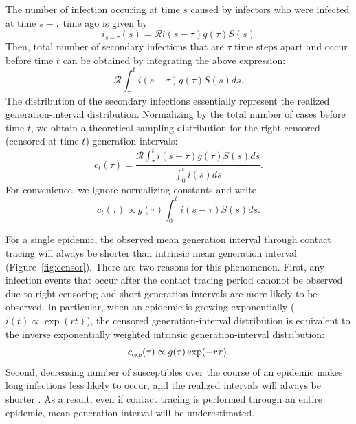 \documentclass[12pt]{article}
\newcommand{\RR}{\ensuremath{{\mathcal R}}}
\newcommand{\tsub}[2]{#1_{{\textrm{\tiny #2}}}}
\begin{document}
The number of infection occuring at time $s$ caused by infectors who were infected at time $s-\tau$ time ago is given by
\begin{equation}
i_{s-\tau}(s) = \RR i(s-\tau) g(\tau) S(s)
\end{equation}
Then, total number of secondary infections that are $\tau$ time steps apart and occur before time $t$ can be obtained by integrating the above expression:
\begin{equation} 
\RR \int_\tau^t i(s-\tau) g(\tau) S(s) ds.
\end{equation}
The distribution of the secondary infections essentially represent the realized generation-interval distribution.
Normalizing by the total number of cases before time $t$, we obtain a theoretical sampling distribution for the right-censored (censored at time $t$) generation intervals:
\begin{equation}
c_t(\tau) = \frac{\RR \int_\tau^t i(s-\tau) g(\tau) S(s) ds}{\int_0^t i(s) ds}.
\end{equation}
For convenience, we ignore normalizing constants and write
\begin{equation}\label{eq:obsg}
c_t(\tau) \propto g(\tau) \int_{0}^t i(s-\tau) S(s) ds.
\end{equation}

For a single epidemic, the observed mean generation interval through contact tracing will always be shorter than intrinsic mean generation interval (Figure~\ref{fig:censor}).
There are two reasons for this phenomenon.
First, any infection events that occur after the contact tracing period canonot be observed due to right censoring and short generation intervals are more likely to be observed.
In particular, when an epidemic is growing exponentially ($i(t) \propto \exp(rt)$), 
the censored generation-interval distribution is equivalent to the inverse exponentially weighted intrinsic generation-interval distribution:
\begin{equation}
\tsub{c}{exp}(\tau) \propto g(\tau) \exp(-r\tau).
\label{eq:exp}
\end{equation}
Second, decreasing number of susceptibles over the course of an epidemic makes long infections less likely to occur, and the realized intervals will always be shorter \citep{champredon2015intrinsic}.
As a result, even if contact tracing is performed through an entire epidemic, mean generation interval will be underestimated.
\end{document}
